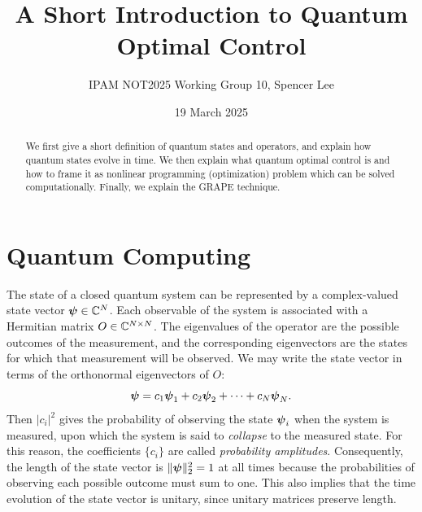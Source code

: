 \documentclass[letterpaper]{tufte-handout}
\title{A Short Introduction to Quantum Optimal Control}
\author[Spencer Lee]{IPAM NOT2025 Working Group 10, Spencer Lee}
\date{19 March 2025}  %
\begin{document}
\maketitle%

\begin{abstract}
\noindent We first give a short definition of quantum states and operators, and explain how quantum states evolve in time. We then explain what quantum optimal control is and how to frame it as nonlinear programming (optimization) problem which can be solved computationally. Finally, we explain the GRAPE technique.
\end{abstract}



\section{Quantum Computing}
The state of a closed quantum system can be represented by a complex-valued state vector $\boldsymbol{\psi} \in \mathbb{C}^N$. Each observable  of the system is associated with a Hermitian matrix $O \in \mathbb{C}^{N \times N}$. The eigenvalues of the operator are the possible outcomes of the measurement, and the corresponding eigenvectors are the states for which that measurement will be observed. We may write the state vector in terms of the orthonormal eigenvectors of $O$:
\begin{equation}
    \boldsymbol{\psi} = c_1 \boldsymbol{\psi}_1 + c_2 \boldsymbol{\psi}_2 + \dots + c_N \boldsymbol{\psi}_N.
\end{equation}
Then $|c_i|^2$ gives the probability of observing the state $\boldsymbol{\psi}_i$ when the system is measured, upon which the system is said to \emph{collapse} to the measured state. For this reason, the coefficients $\{c_i\}$ are called \emph{probability amplitudes}. Consequently, the length of the state vector is $\| \boldsymbol{\psi} \|_2^2 = 1$ at all times because the probabilities of observing each possible outcome must sum to one. This also implies that the time evolution of the state vector is unitary, since unitary matrices preserve length.
\end{document}

